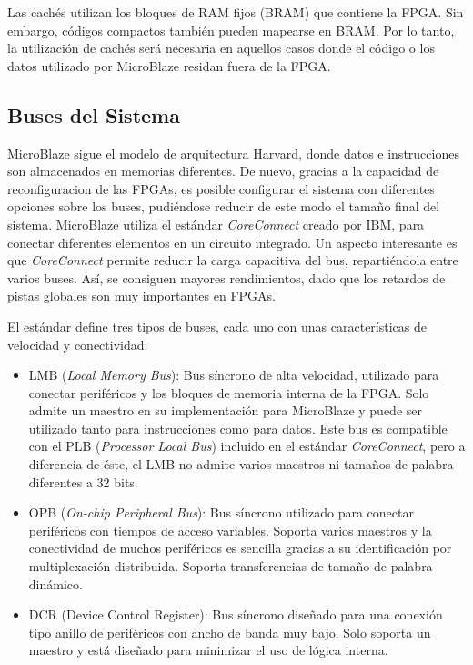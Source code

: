 Las cachés utilizan los bloques de RAM fijos (BRAM) que contiene la FPGA. Sin
embargo, códigos compactos también pueden mapearse en BRAM. Por lo tanto, la
utilización de cachés será necesaria en aquellos casos donde el código o los
datos utilizado por MicroBlaze residan fuera de la FPGA.

\subsection{Buses del Sistema}

MicroBlaze sigue el modelo de arquitectura Harvard, donde datos e instrucciones
son almacenados en memorias diferentes. De nuevo, gracias a la capacidad de
reconfiguracion de las FPGAs, es posible configurar el sistema con diferentes
opciones sobre los buses, pudiéndose reducir de este modo el tamaño final del
sistema. MicroBlaze utiliza el estándar \emph{CoreConnect} creado por IBM, para
conectar diferentes elementos en un circuito integrado. Un aspecto interesante
es que \emph{CoreConnect} permite reducir la carga capacitiva del bus,
repartiéndola entre varios buses. Así, se consiguen mayores rendimientos, dado
que los retardos de pistas globales son muy importantes en FPGAs.

El estándar define tres tipos de buses, cada uno con unas características de
velocidad y conectividad:

\begin{itemize}
 \item LMB (\emph{Local Memory Bus}): Bus síncrono de alta velocidad, utilizado
para conectar periféricos y los bloques de memoria interna de la FPGA. Solo
admite un maestro en su implementación para MicroBlaze y puede ser utilizado
tanto para instrucciones como para datos. Este bus es compatible con el PLB
(\emph{Processor Local Bus}) incluido en el estándar \emph{CoreConnect}, pero a
diferencia de éste, el LMB no admite varios maestros ni tamaños de palabra
diferentes a 32 bits.
 
  \item OPB (\emph{On-chip Peripheral Bus}): Bus síncrono utilizado para
conectar periféricos con tiempos de acceso variables. Soporta varios maestros y
la conectividad de muchos periféricos es sencilla gracias a su identificación
por multiplexación distribuida. Soporta transferencias de tamaño de palabra
dinámico.

 \item 	DCR (Device Control Register): Bus síncrono diseñado para una conexión
tipo anillo de periféricos con ancho de banda muy bajo. Solo soporta un maestro
y está diseñado para minimizar el uso de lógica interna.
\end{itemize}

